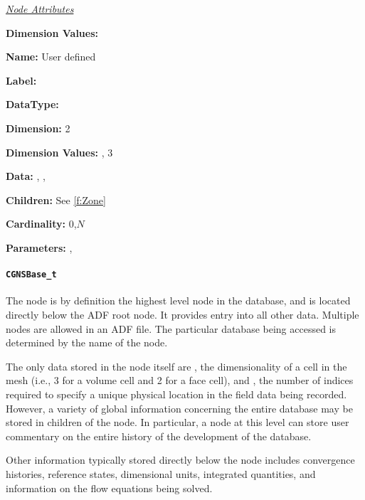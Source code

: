 \textit{\uline{Node Attributes}}
\begin{Ventryic}{\textbf{Dimension Values:}}
\item [\textbf{Name:}]
      User defined
\item [\textbf{Label:}]
\item [\textbf{DataType:}]
\item [\textbf{Dimension:}]
      2
\item [\textbf{Dimension Values:}]
      , 3
\item [\textbf{Data:}]
      , ,
\item [\textbf{Children:}]
      See \autoref{f:Zone}
\item [\textbf{Cardinality:}]
      0,$N$
\item [\textbf{Parameters:}]
      , 
\end{Ventryic}

\paragraph{\texttt{CGNSBase\_t}}

The  node is by definition the highest level node in
the database, and is located directly below the ADF root node.
It provides entry into all other data.
Multiple  nodes are allowed in an ADF file.
The particular database being accessed is determined by the name
of the  node.

The only data stored in the node itself are , the
dimensionality of a cell in the mesh (i.e., 3 for a volume cell and 2
for a face cell), and , the number of indices
required to specify a unique physical location in the field data being
recorded. However, a variety of global information concerning the entire
database may be stored in children of the  node. In
particular, a  node at this level can store user
commentary on the entire history of the development of the database.

Other information typically stored directly below the 
node includes convergence histories, reference states, dimensional
units, integrated quantities, and information on the flow equations
being solved.

